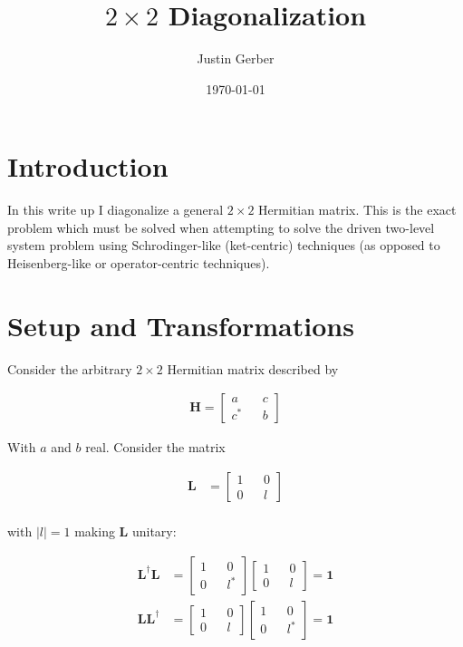 \documentclass[12pt]{article}
\newcommand{\bv}[1]{\boldsymbol{#1}}
\begin{document}
\title{$2\times2$ Diagonalization}
\author{Justin Gerber}
\date{\today}
\maketitle

\section{Introduction}

In this write up I diagonalize a general $2\times2$ Hermitian matrix. This is the exact problem which must be solved when attempting to solve the driven two-level system problem using Schrodinger-like (ket-centric) techniques (as opposed to Heisenberg-like or operator-centric techniques). 

\section{Setup and Transformations}
Consider the arbitrary $2\times 2$ Hermitian matrix described by

\begin{align}
\bv{H} = 
\begin{bmatrix}
a && c\\
c^* && b
\end{bmatrix}
\end{align}

With $a$ and $b$ real. Consider the matrix

\begin{align}
\bv{L} &= 
\begin{bmatrix}
1 && 0\\
0 && l
\end{bmatrix}\\
\end{align}

with $|l| = 1$ making $\bv{L}$ unitary:

\begin{align}
\bv{L}^{\dag} \bv{L} &=
\begin{bmatrix}
1 && 0\\
0 && l^*
\end{bmatrix}
\begin{bmatrix}
1 && 0\\
0 && l
\end{bmatrix}
= 
\bv{1}\\
\bv{L} \bv{L}^{\dag} &=
\begin{bmatrix}
1 && 0\\
0 && l
\end{bmatrix}
\begin{bmatrix}
1 && 0\\
0 && l^*
\end{bmatrix}
= 
\bv{1}
\end{align}
\end{document}

